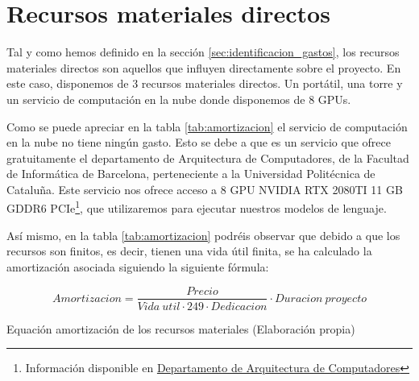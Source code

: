 \section{Recursos materiales directos}
\label{sec:recursos_directos}


Tal y como hemos definido en la sección \ref{sec:identificacion_gastos}, los recursos materiales directos son aquellos que influyen directamente sobre el
proyecto. En este caso, disponemos de 3 recursos materiales directos. Un portátil, una torre y un servicio de computación en la nube donde disponemos de 8 GPUs.

Como se puede apreciar en la tabla \ref{tab:amortizacion} el servicio de computación en la nube no tiene ningún gasto. Esto se debe a que es un servicio que ofrece
gratuitamente el departamento de Arquitectura de Computadores, de la Facultad de Informática de Barcelona, perteneciente a la Universidad Politécnica de Cataluña.
Este servicio nos ofrece acceso a 8 GPU NVIDIA RTX 2080TI 11 GB GDDR6 PCIe\footnote{Información disponible en \href{https://www.ac.upc.edu/ca/nosaltres/serveis-tic/blog/nou-node-amb-gpus-al-cluster-sert}{Departamento de Arquitectura de Computadores}},
que utilizaremos para ejecutar nuestros modelos de lenguaje.

Así mismo, en la tabla \ref{tab:amortizacion} podréis observar que debido a que los recursos son finitos, es decir, tienen una vida útil finita, se ha calculado la
amortización asociada siguiendo la siguiente fórmula:

\begin{myequation}[h]
    \begin{equation}
        Amortizacion= \frac{Precio}{Vida\ util \cdot 249\cdot Dedicacion}\cdot Duracion\ proyecto
    \label{ec:ec1}
    \end{equation}
    \caption[Equación amortización de los recursos materiales]{Equación amortización de los recursos materiales (Elaboración propia)}
\end{myequation} 

